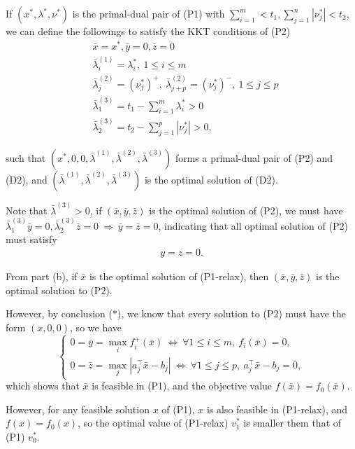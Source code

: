 \documentclass[11pt]{article}
\begin{document}
If $(x^*, \lambda^*, \nu^*)$ is the primal-dual pair of (P1) with $\sum_{i=1}^{m} < t_1, \sum_{j=1}^{n} |\nu_j^*| < t_2$, we can define the followings to satisfy the KKT conditions of (P2)
\begin{align*}
  & \bar{x} = x^*, \bar y = 0, \bar z=0\\
  & \bar{\lambda}_i^{(1)} = \lambda_i^*,\  1\leq i\leq m\\
  & \bar{\lambda}_j^{(2)} = (\nu_j^*)^+,\  \bar{\lambda}_{j+p}^{(2)} = (\nu_j^*)^-, \ 1\leq j\leq p\\
  & \bar{\lambda}_1^{(3)} = t_1 - \sum_{i=1}^{m}\lambda_i^*>0\\
  & \bar{\lambda}_2^{(3)} = t_2 - \sum_{j=1}^{p} |\nu_j^*| >0,
\end{align*}

such that $(x^*, 0, 0, \bar{\lambda}^{(1)}, \bar{\lambda}^{(2)}, \bar{\lambda}^{(3)})$ forms a primal-dual pair of (P2) and (D2), and $(\bar{\lambda}^{(1)}, \bar{\lambda}^{(2)}, \bar{\lambda}^{(3)})$ is the optimal solution of (D2). 

Note that $\bar{\lambda}^{(3)} > 0$, if $(\bar x, \bar{y}, \bar{z})$ is the optimal solution of (P2), we must have $\bar{\lambda}_1^{(3)} \bar{y} = 0, \bar{\lambda}_2^{(3)} \bar{z} =0\  \Rightarrow\ \bar{y} = \bar{z} = 0$, indicating that all optimal solution of (P2) must satisfy 
\begin{align}
  y = z = 0. \tag{$*$}
\end{align}

From part (b), if $\bar{x}$ is the optimal solution of (P1-relax), then $(\bar{x}, \bar{y}, \bar{z})$ is the optimal solution to (P2).

However, by conclusion ($*$), we know that every solution to (P2) must have the form $(x, 0,0)$, so we have
$$
\left\{\begin{array}{l}
0=\bar{y}=\max _i f_i^{+}(\bar{x})\ \Leftrightarrow\  \forall 1 \leq i \leq m,\  f_i(\bar{x})=0, \\
0=\bar{z}=\max _j\left|a_j^{\top} \bar{x}-b_j\right|\  \Leftrightarrow\  \forall 1 \leq j \leq p, \  a_j^{\top} \bar{x}-b_j=0,
\end{array}\right.
$$
which shows that $\bar{x}$ is feasible in (P1), and the objective value $f(\bar{x}) = f_0(\bar{x})$.

However, for any feasible solution $x$ of (P1), $x$ is also feasible in (P1-relax), and $f(x) = f_0(x)$, so the optimal value of (P1-relax) $v_1^*$ is smaller them that of (P1) $v_0^*$.
\end{document}
